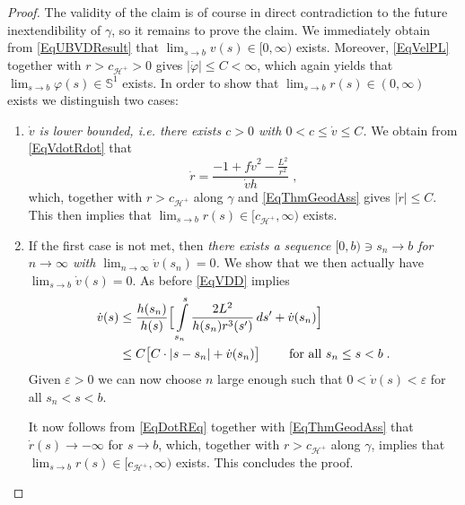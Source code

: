 \documentclass[reqno]{article}
\newcommand{\Hp}{\mathcal{H}^+}
\begin{document}
\begin{proof}
The validity of the claim is of course in direct contradiction to the future inextendibility of $\gamma$, so it remains to prove the claim. We immediately obtain from \eqref{EqUBVDResult} that $\lim_{s \to b} v(s) \in [0, \infty)$ exists. Moreover, \eqref{EqVelPL} together with $r > c_{\Hp}>0$ gives $|\dot{\varphi}| \leq C < \infty$, which again yields that $\lim_{s \to b} \varphi(s) \in \mathbb{S}^1$ exists. In order to show that $\lim_{s \to b} r(s) \in (0, \infty)$ exists we distinguish two cases:
\begin{enumerate}
\item \emph{$\dot{v}$ is lower bounded, i.e. there exists $c>0$ with $0 < c \leq \dot{v} \leq C$.} 
 We obtain from \eqref{EqVdotRdot} that 
 \begin{equation}
 \label{EqDotREq}
 \dot{r} = \frac{-1 + f\dot{v}^2 - \frac{L^2}{r^2}}{ \dot{v} h}\;,
 \end{equation}
  which, together with  $r > c_{\Hp}$ along $\gamma$ and \eqref{EqThmGeodAss} gives $|\dot{r}| \leq C$. This then implies that $\lim_{s \to b} r(s) \in [c_{\Hp}, \infty)$ exists.
 \item If the first case is not met, then \emph{there exists a sequence $[0, b) \ni s_n \to b$ for $n \to \infty$ with $\lim_{n \to \infty} \dot{v}(s_n) = 0$.} We show that we then actually have $\lim_{s \to b} \dot{v}(s) = 0$. As before \eqref{EqVDD} implies 
 \begin{equation*}
 \begin{split}
  \dot{v}(s) &\leq  \frac{h(s_n)}{h(s)} \Big[ \int \limits_{s_n}^s \frac{2L^2}{h(s_n) r^3(s')} \, ds' + \dot{v}(s_n)\Big] \\
  &\leq C \big[ C \cdot |s - s_n| + \dot{v}(s_n)\big] \qquad \textnormal{ for all } s_n \leq s < b \;.
  \end{split}
  \end{equation*}
Given $\varepsilon>0$ we can now choose $n$ large enough such that $0< \dot{v}(s) < \varepsilon$ for all $ s_n < s < b$. 

It now follows from \eqref{EqDotREq} together with \eqref{EqThmGeodAss} that $\dot{r}(s) \to - \infty$ for $s \to b$, which, together with $r > c_{\Hp}$ along $\gamma$, implies that $\lim_{s \to b} r(s) \in [c_{\Hp}, \infty)$ exists. This concludes the proof.
\end{enumerate}
\end{proof}
\end{document}
